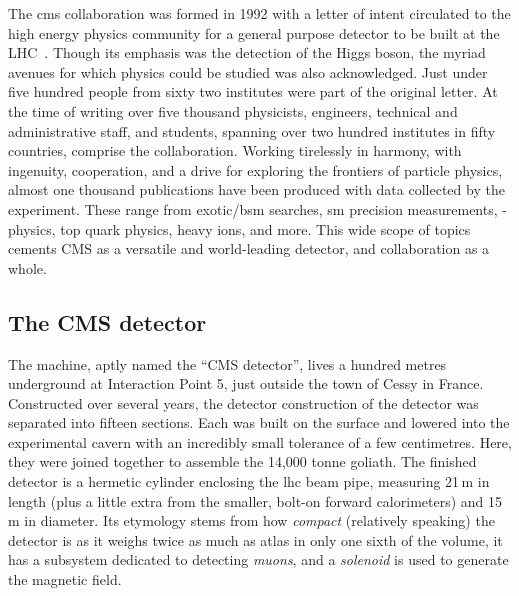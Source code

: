 The \acrfull{cms} collaboration was formed in 1992 with a letter of intent circulated to the high energy physics community for a general purpose detector to be built at the LHC~\cite{DellaNegra:290808}. Though its emphasis was the detection of the Higgs boson, the myriad avenues for which physics could be studied was also acknowledged. Just under five hundred people from sixty two institutes were part of the original letter. At the time of writing over five thousand physicists, engineers, technical and administrative staff, and students, spanning over two hundred institutes in fifty countries, comprise the collaboration. Working tirelessly in harmony, with ingenuity, cooperation, and a drive for exploring the frontiers of particle physics, almost one thousand publications have been produced with data collected by the experiment. These range from exotic/\acrshort{bsm} searches, \acrlong{sm} precision measurements, \PB-physics, top quark physics, heavy ions, and more. This wide scope of topics cements CMS as a versatile and world-leading detector, and collaboration as a whole.




\subsection{The CMS detector}
\label{subsec:cms_detector_itself}

The machine, aptly named the ``CMS detector'', lives a hundred metres underground at Interaction Point 5, just outside the town of Cessy in France. Constructed over several years, the detector construction of the detector was separated into fifteen sections. Each was built on the surface and lowered into the experimental cavern with an incredibly small tolerance of a few centimetres. Here, they were joined together to assemble the 14,000 tonne goliath. The finished detector is a hermetic cylinder enclosing the \acrshort{lhc} beam pipe, measuring 21\,m in length (plus a little extra from the smaller, bolt-on forward calorimeters) and 15\,m in diameter. Its etymology stems from how \emph{compact} (relatively speaking) the detector is as it weighs twice as much as \acrshort{atlas} in only one sixth of the volume, it has a subsystem dedicated to detecting \emph{muons}, and a \emph{solenoid} is used to generate the magnetic field.


